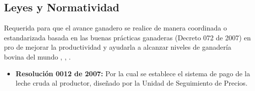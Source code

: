 \subsection{Leyes y Normatividad}  \label{leyes}
Requerida para que el avance ganadero se realice de manera coordinada o estandarizada basada en las buenas prácticas ganaderas (Decreto 072 de 2007) en pro de mejorar la productividad y ayudarla a alcanzar niveles de ganadería bovina del mundo \cite{invima}, \cite{leylacteos}, \cite{minsaludleche}. 
\begin{itemize}
	\item \textbf{Resolución 0012 de 2007:} Por la cual se establece el sistema de pago de la leche cruda al productor, diseñado por la Unidad de Seguimiento de Precios.

\end{itemize}

